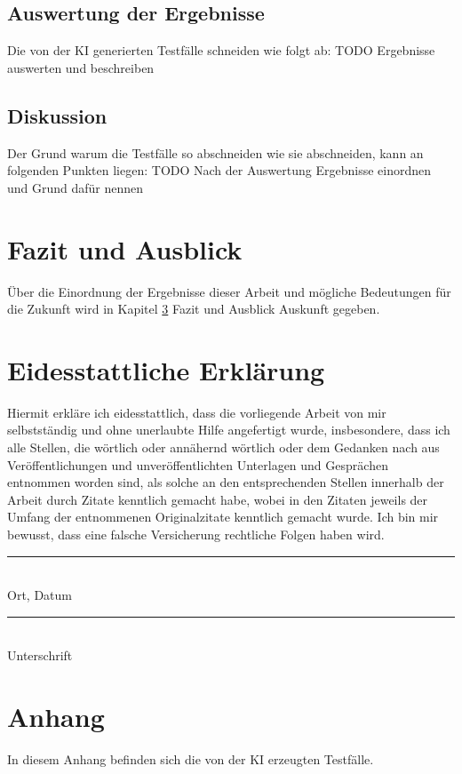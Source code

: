\documentclass[12pt,toc=bib,toc=listof]{scrreprt}
\begin{document}
\section{Auswertung der Ergebnisse} %
\label{sec:auswertungDerErgebnisse}
Die von der KI generierten Testfälle schneiden wie folgt ab:
TODO Ergebnisse auswerten und beschreiben

\section{Diskussion} %
\label{sec:diskussion}
Der Grund warum die Testfälle so abschneiden wie sie abschneiden, kann an folgenden Punkten liegen:
TODO Nach der Auswertung Ergebnisse einordnen und Grund dafür nennen

\chapter{Fazit und Ausblick} %
\label{sec:fazitUndAusblick}
Über die Einordnung der Ergebnisse dieser Arbeit und mögliche Bedeutungen für die Zukunft wird in Kapitel \ref{sec:fazitUndAusblick} Fazit und Ausblick Auskunft gegeben.

\printbibliography
\newpage

\chapter*{Eidesstattliche Erklärung} %
\label{sec:eidesstattlicheErklärung}
Hiermit erkläre ich eidesstattlich, dass die vorliegende Arbeit von mir selbstständig und ohne unerlaubte Hilfe angefertigt wurde, insbesondere, dass ich alle Stellen, die wörtlich oder annähernd wörtlich oder dem Gedanken nach aus Veröffentlichungen und unveröffentlichten Unterlagen und Gesprächen entnommen worden sind, als solche an den entsprechenden Stellen innerhalb der Arbeit durch Zitate kenntlich gemacht habe, wobei in den Zitaten jeweils der Umfang der entnommenen Originalzitate kenntlich gemacht wurde. Ich bin mir bewusst, dass eine falsche Versicherung rechtliche Folgen haben wird.
\newline
\newline
\newline
\newline
\noindent
\begin{minipage}[t]{0.4\textwidth} 
    \centering 
    \rule{\textwidth}{0.4pt} \\ 
    Ort, Datum
\end{minipage}%
\hfill
\begin{minipage}[t]{0.4\textwidth} 
    \centering 
    \rule{\textwidth}{0.4pt} \\ 
    Unterschrift
\end{minipage}

\chapter*{Anhang} %
\label{sec:anhang}
In diesem Anhang befinden sich die von der KI erzeugten Testfälle.

\end{document}
